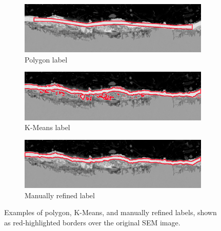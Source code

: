 \begin{figure}[H]
    \centering

    \begin{subfigure}{0.8\textwidth}
        \centering
        \includegraphics[width=\linewidth]{PICTURES/MASK/2.png}
        \caption{Polygon label}
        \label{fig:polygon_sem_color}
    \end{subfigure}

    \begin{subfigure}{0.8\textwidth}
        \centering
        \includegraphics[width=\linewidth]{PICTURES/MASK/1.png}
        \caption{K-Means label}
        \label{fig:kmean_sem_color}
    \end{subfigure}

    \begin{subfigure}{0.8\textwidth}
        \centering
        \includegraphics[width=\linewidth]{PICTURES/MASK/3.png}
        \caption{Manually refined label}
        \label{fig:3}
    \end{subfigure}

    \caption{Examples of polygon, K-Means, and manually refined labels, shown as red-highlighted borders over the original SEM image.}    \label{fig:all-masks}
\end{figure}

